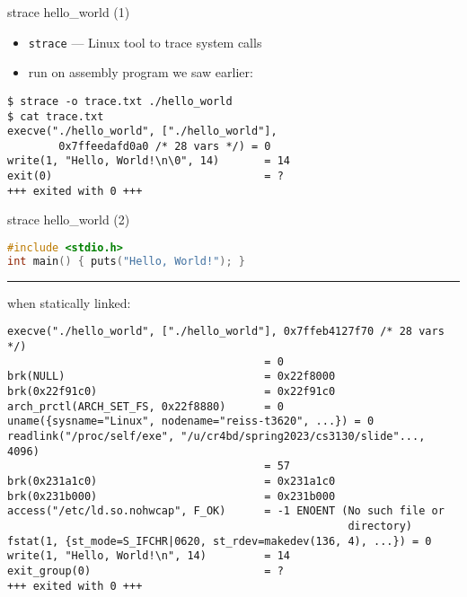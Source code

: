 \begin{frame}[fragile]{strace hello\_world (1)}
\begin{itemize}
\item \texttt{strace} --- Linux tool to trace system calls
\item run on assembly program we saw earlier:
\end{itemize}
\begin{Verbatim}[fontsize=\small]
$ strace -o trace.txt ./hello_world
$ cat trace.txt
execve("./hello_world", ["./hello_world"],
        0x7ffeedafd0a0 /* 28 vars */) = 0
write(1, "Hello, World!\n\0", 14)       = 14
exit(0)                                 = ?
+++ exited with 0 +++
\end{Verbatim}
\end{frame}

\begin{frame}[fragile]{strace hello\_world (2)}
\begin{lstlisting}[language=C]
#include <stdio.h>
int main() { puts("Hello, World!"); }
\end{lstlisting}
\hrule
when statically linked:
\begin{Verbatim}[fontsize=\fontsize{10}{11}\selectfont]
execve("./hello_world", ["./hello_world"], 0x7ffeb4127f70 /* 28 vars */)
                                        = 0
brk(NULL)                               = 0x22f8000
brk(0x22f91c0)                          = 0x22f91c0
arch_prctl(ARCH_SET_FS, 0x22f8880)      = 0
uname({sysname="Linux", nodename="reiss-t3620", ...}) = 0
readlink("/proc/self/exe", "/u/cr4bd/spring2023/cs3130/slide"..., 4096)
                                        = 57
brk(0x231a1c0)                          = 0x231a1c0
brk(0x231b000)                          = 0x231b000
access("/etc/ld.so.nohwcap", F_OK)      = -1 ENOENT (No such file or
                                                     directory)
fstat(1, {st_mode=S_IFCHR|0620, st_rdev=makedev(136, 4), ...}) = 0
write(1, "Hello, World!\n", 14)         = 14
exit_group(0)                           = ?
+++ exited with 0 +++
\end{Verbatim}
\end{frame}

